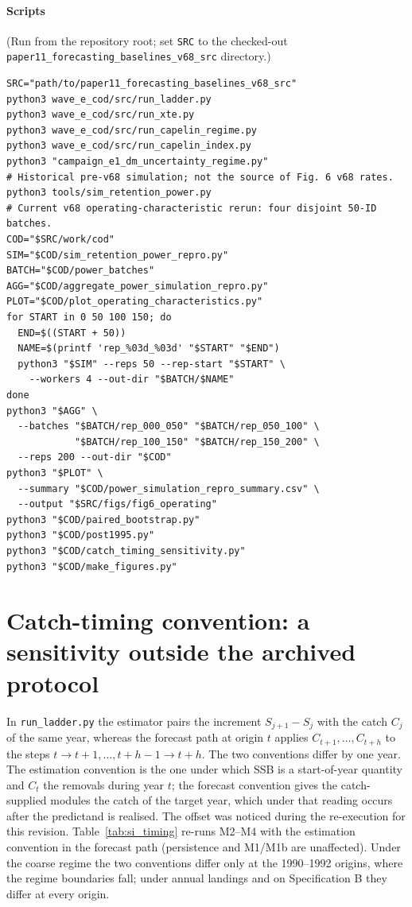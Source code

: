 \documentclass[preprint,11pt,authoryear]{elsarticle}
\theoremstyle{remark}
\begin{document}
\paragraph{Scripts} (Run from the repository root; set \texttt{SRC} to the checked-out \texttt{paper11\_forecasting\_\allowbreak{}baselines\_v68\_src} directory.)
{\footnotesize\begin{verbatim}
SRC="path/to/paper11_forecasting_baselines_v68_src"
python3 wave_e_cod/src/run_ladder.py
python3 wave_e_cod/src/run_xte.py
python3 wave_e_cod/src/run_capelin_regime.py
python3 wave_e_cod/src/run_capelin_index.py
python3 "campaign_e1_dm_uncertainty_regime.py"
# Historical pre-v68 simulation; not the source of Fig. 6 v68 rates.
python3 tools/sim_retention_power.py
# Current v68 operating-characteristic rerun: four disjoint 50-ID batches.
COD="$SRC/work/cod"
SIM="$COD/sim_retention_power_repro.py"
BATCH="$COD/power_batches"
AGG="$COD/aggregate_power_simulation_repro.py"
PLOT="$COD/plot_operating_characteristics.py"
for START in 0 50 100 150; do
  END=$((START + 50))
  NAME=$(printf 'rep_%03d_%03d' "$START" "$END")
  python3 "$SIM" --reps 50 --rep-start "$START" \
    --workers 4 --out-dir "$BATCH/$NAME"
done
python3 "$AGG" \
  --batches "$BATCH/rep_000_050" "$BATCH/rep_050_100" \
            "$BATCH/rep_100_150" "$BATCH/rep_150_200" \
  --reps 200 --out-dir "$COD"
python3 "$PLOT" \
  --summary "$COD/power_simulation_repro_summary.csv" \
  --output "$SRC/figs/fig6_operating"
python3 "$COD/paired_bootstrap.py"
python3 "$COD/post1995.py"
python3 "$COD/catch_timing_sensitivity.py"
python3 "$COD/make_figures.py"
\end{verbatim}}

\FloatBarrier
\section{Catch-timing convention: a sensitivity outside the archived protocol}\label{si:timing}

In \texttt{run\_ladder.py} the estimator pairs the increment $S_{j+1}-S_j$ with the catch $C_j$ of the same year, whereas the forecast path at origin $t$ applies $C_{t+1},\dots,C_{t+h}$ to the steps $t\to t+1,\dots,t+h-1\to t+h$. The two conventions differ by one year. The estimation convention is the one under which SSB is a start-of-year quantity and $C_t$ the removals during year $t$; the forecast convention gives the catch-supplied modules the catch of the target year, which under that reading occurs after the predictand is realised. The offset was noticed during the re-execution for this revision. Table~\ref{tab:si_timing} re-runs M2--M4 with the estimation convention in the forecast path (persistence and M1/M1b are unaffected). Under the coarse regime the two conventions differ only at the 1990--1992 origins, where the regime boundaries fall; under annual landings and on Specification B they differ at every origin.
\end{document}
